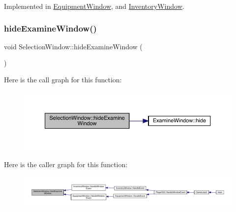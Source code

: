 Implemented in \mbox{\hyperlink{class_equipment_window_a9ff317935c0c7698a4cde661348ad059}{Equipment\+Window}}, and \mbox{\hyperlink{class_inventory_window_aef14cbe5f17a626c01df9948aac71259}{Inventory\+Window}}.

\mbox{\label{class_selection_window_a6b24ed933c8d785bda07ed9fd2283a18}} 
\subsubsection{\texorpdfstring{hide\+Examine\+Window()}{hideExamineWindow()}}
{\footnotesize\ttfamily void Selection\+Window\+::hide\+Examine\+Window (\begin{DoxyParamCaption}{ }\end{DoxyParamCaption})}

Here is the call graph for this function\+:
\nopagebreak
\begin{figure}[H]
\begin{center}
\leavevmode
\includegraphics[width=350pt]{db/d9c/class_selection_window_a6b24ed933c8d785bda07ed9fd2283a18_cgraph}
\end{center}
\end{figure}
Here is the caller graph for this function\+:
\nopagebreak
\begin{figure}[H]
\begin{center}
\leavevmode
\includegraphics[width=350pt]{db/d9c/class_selection_window_a6b24ed933c8d785bda07ed9fd2283a18_icgraph}
\end{center}
\end{figure}
\mbox{\label{class_selection_window_a94b39debec610af4bba8d53e92618876}} 

